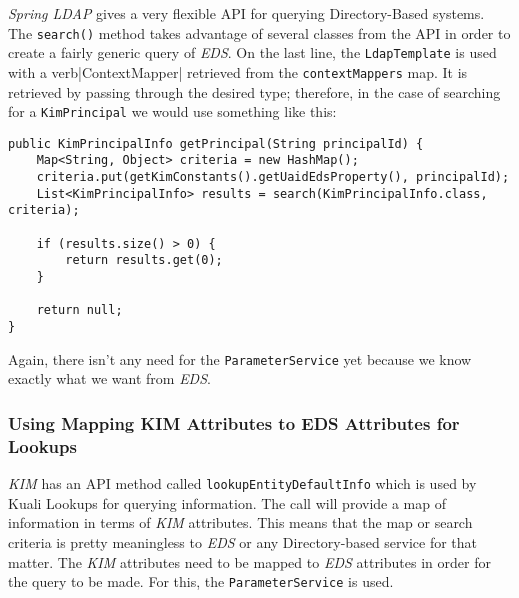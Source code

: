 \documentclass[12pt,notitlepage]{article}
\begin{document}
\emph{Spring LDAP} gives a very flexible API for querying Directory-Based systems. The \verb|search()| method
takes advantage of several classes from the API in order to create a fairly generic query of \emph{EDS}. On the 
last line, the \verb|LdapTemplate| is used with a verb|ContextMapper| retrieved from the \verb|contextMappers|
map. It is retrieved by passing through the desired type; therefore, in the case of searching for a \verb|KimPrincipal|
we would use something like this:

\begin{lstlisting}
public KimPrincipalInfo getPrincipal(String principalId) {
    Map<String, Object> criteria = new HashMap();
    criteria.put(getKimConstants().getUaidEdsProperty(), principalId);
    List<KimPrincipalInfo> results = search(KimPrincipalInfo.class, criteria);

    if (results.size() > 0) {
        return results.get(0);
    }
    
    return null;
}
\end{lstlisting}
Again, there isn't any need for the \verb|ParameterService| yet because we know exactly what we want from 
\emph{EDS}.

\subsubsection{Using Mapping KIM Attributes to EDS Attributes for Lookups}
\emph{KIM} has an API method called \verb|lookupEntityDefaultInfo| which is used by Kuali Lookups for 
querying information. The call will provide a map of information in terms of \emph{KIM} attributes. This
means that the map or search criteria is pretty meaningless to \emph{EDS} or any Directory-based service
for that matter. The \emph{KIM} attributes need to be mapped to \emph{EDS} attributes in order for the
query to be made. For this, the \verb|ParameterService| is used.
\end{document}
